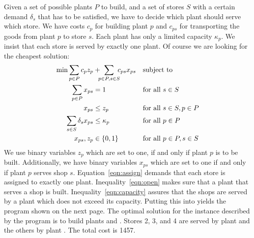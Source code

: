 Given a set of possible plants $P$ to build, and a set of stores $S$
with a certain demand $\delta_s$ that has to be satisfied, we have
to decide which plant should serve which store.
We have costs $c_p$ for building plant $p$ and $c_{ps}$
for transporting the goods from plant $p$ to store $s$.
Each plant has only a limited capacity $\kappa_p$.
We insist that each store is served by exactly one plant.
Of course we are looking for the cheapest solution:
%
\begin{align}
\min\sum_{p\in P}c_p z_p&
   +\!\!\!\sum_{p\in P, s\in S}\!\!\!c_{ps} x_{ps}&&\mbox{subject to}\nonumber\\
\sum_{p\in P} x_{ps}& = 1&&\text{for all } s\in S\label{eqn:assign}\\
x_{ps}&\leq z_{p}&&\text{for all } s\in S, p\in P\label{eqn:open}\\
\sum_{s\in S} \delta_s x_{ps}&\leq\kappa_p&&\text{for all } p\in P\label{eqn:capacity}\\
x_{ps},z_p&\in\{0,1\}&&\text{for all } p\in P, s\in S\nonumber
\end{align}
%
We use binary variables $z_p$ which are set to one, if and only if plant $p$ is
to be built. Additionally, we have binary variables $x_{ps}$
which are set to one if and only if plant $p$ serves shop $s$.
Equation~\eqref{eqn:assign} demands that each store is assigned to
exactly one plant. Inequality~\eqref{eqn:open} makes sure that a plant
that serves a shop is built. Inequality~\eqref{eqn:capacity}
assures that the shops are served by a plant which does not exceed its
capacity. Putting this into \zimpl yields the program shown on the
next page.
The optimal solution for the instance described by the program is to build plants  and
. Stores 2, 3, and 4 are served by plant  and the others by
plant . The total cost is 1457.

